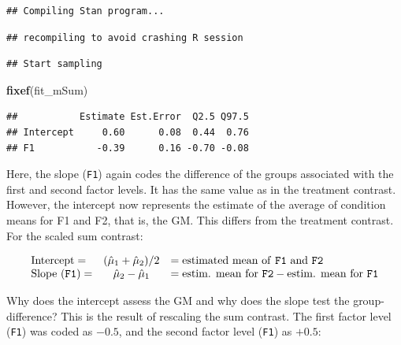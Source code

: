 \documentclass[12pt,]{krantz}
\newenvironment{Shaded}{\begin{snugshade}}{\end{snugshade}}
\newcommand{\KeywordTok}[1]{\textcolor[rgb]{0.13,0.29,0.53}{\textbf{#1}}}
\newcommand{\OperatorTok}[1]{\textcolor[rgb]{0.81,0.36,0.00}{\textbf{#1}}}
\newcommand{\NormalTok}[1]{#1}
\theoremstyle{definition}
\theoremstyle{definition}
\theoremstyle{definition}
\theoremstyle{remark}
\begin{document}
\begin{verbatim}
## Compiling Stan program...
\end{verbatim}

\begin{verbatim}
## recompiling to avoid crashing R session
\end{verbatim}

\begin{verbatim}
## Start sampling
\end{verbatim}

\begin{Shaded}
\begin{Highlighting}[]
\KeywordTok{fixef}\NormalTok{(fit_mSum)}
\end{Highlighting}
\end{Shaded}

\begin{verbatim}
##           Estimate Est.Error  Q2.5 Q97.5
## Intercept     0.60      0.08  0.44  0.76
## F1           -0.39      0.16 -0.70 -0.08
\end{verbatim}

Here, the slope (\texttt{F1}) again codes the difference of the groups
associated with the first and second factor levels. It has the same
value as in the treatment contrast. However, the intercept now
represents the estimate of the average of condition means for F1 and F2,
that is, the GM. This differs from the treatment contrast. For the
scaled sum contrast:

\begin{equation}
\begin{array}{lcl}
\text{Intercept} = & (\hat{\mu}_1 + \hat{\mu}_2)/2 & = \text{estimated mean of \texttt{F1} and \texttt{F2}} \\
\text{Slope (\texttt{F1})} = & \hat{\mu}_2 - \hat{\mu}_1 & = \text{estim. mean for \texttt{F2}} - \text{estim. mean for \texttt{F1}} 
\end{array}
\label{def:beta2}
\end{equation}

Why does the intercept assess the GM and why does the slope test the
group-difference? This is the result of rescaling the sum contrast. The
first factor level (\texttt{F1}) was coded as \(-0.5\), and the second
factor level (\texttt{F1}) as \(+0.5\):

\begin{Shaded}
\end{Shaded}
\end{document}
